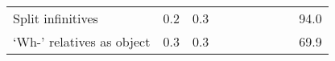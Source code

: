\begin{table}[!t]
\begin{tabular*}{\linewidth}{@{\extracolsep{\fill}}lrrrrrrrrr}
Split infinitives & 0.2 & 0.3 & {\cellcolor[HTML]{FDDBC7}{\textcolor[HTML]{000000}{79\%}}} & {\cellcolor[HTML]{F7F7F7}{\textcolor[HTML]{000000}{94\%}}} & {\cellcolor[HTML]{F7F7F7}{\textcolor[HTML]{000000}{110\%}}} & {\cellcolor[HTML]{F7F7F7}{\textcolor[HTML]{000000}{104\%}}} & {\cellcolor[HTML]{D6604D}{\textcolor[HTML]{FFFFFF}{44\%}}} & {\cellcolor[HTML]{D6604D}{\textcolor[HTML]{FFFFFF}{49\%}}} & 94.0 \\ 
‘Wh-’ relatives as object & 0.3 & 0.3 & {\cellcolor[HTML]{B2182B}{\textcolor[HTML]{FFFFFF}{20\%}}} & {\cellcolor[HTML]{B2182B}{\textcolor[HTML]{FFFFFF}{13\%}}} & {\cellcolor[HTML]{B2182B}{\textcolor[HTML]{FFFFFF}{8\%}}} & {\cellcolor[HTML]{B2182B}{\textcolor[HTML]{FFFFFF}{13\%}}} & {\cellcolor[HTML]{F4A582}{\textcolor[HTML]{000000}{61\%}}} & {\cellcolor[HTML]{F4A582}{\textcolor[HTML]{000000}{62\%}}} & 69.9 \\ 
\bottomrule
\end{tabular*}
\end{table}

